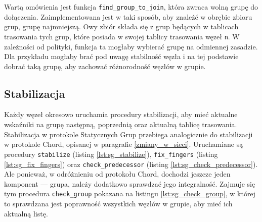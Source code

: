 \documentclass[12pt, twoside, openany]{report}
\begin{document}
Wartą omówienia jest funkcja \texttt{find\_group\_to\_join}, która zwraca wolną grupę do dołączenia. Zaimplementowana jest w taki sposób, aby znaleźć w obrębie zbioru grup, grupę najmniejszą. Owy zbiór składa się z grup będących w tablicach trasowania tych grup, które posiada w swojej tablicy trasowania węzeł \texttt{n}. W zależności od polityki, funkcja ta mogłaby wybierać grupę na odmiennej zasadzie. Dla przykładu mogłaby brać pod uwagę stabilność węzła i na tej podstawie dobrać taką grupę, aby zachować różnorodność węzłów w grupie.






\subsection{Stabilizacja}

Każdy węzeł okresowo uruchamia procedury stabilizacji, aby mieć aktualne wskaźniki na grupę następną, poprzednią oraz aktualną tablicę trasowania. Stabilizacja w protokole Statycznych Grup przebiega analogicznie do stabilizacji w protokole Chord, opisanej w paragrafie \ref{zmiany_w_sieci}. Uruchamiane są procedury \texttt{stabilize} (listing \ref{lst:sg_stabilize}), \texttt{fix\_fingers} (listing \ref{lst:sg_fix_fingers}) oraz \texttt{check\_predecessor} (listing \ref{lst:sg_check_predecessor}). Ale ponieważ, w odróżnieniu od protokołu Chord, dochodzi jeszcze jeden komponent --- grupa, należy dodatkowo sprawdzać jego integralność. Zajmuje się tym procedura \texttt{check\_group} pokazana na listingu \ref{lst:sg_check_group}, w której to sprawdzana jest poprawność wszystkich węzłów w grupie, aby mieć ich aktualną listę.




\end{document}
